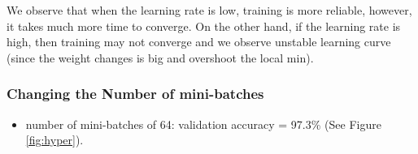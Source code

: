 \documentclass[a4paper]{article}
\begin{document}
\begin{enumerate}
We observe that when the learning rate is low, training is more reliable, however, it takes much more time to converge. On the other hand, if the learning rate is high, then training may not converge and we observe unstable learning curve (since the weight changes is big and overshoot the local min).   


%
%
%
%
%  
%
%

\subsubsection{Changing the Number of mini-batches}


\begin{itemize}

\item number of mini-batches of 64: validation accuracy = 97.3\% (See Figure \ref{fig:hyper}).


\end{itemize}
\end{enumerate}
\end{document}
